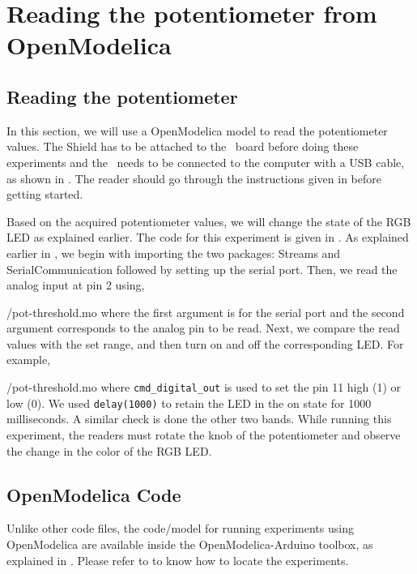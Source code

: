 \section{Reading the potentiometer from OpenModelica}
\subsection{Reading the potentiometer}
In this section, we will use a OpenModelica model to read the potentiometer values.  
The Shield has to be attached to the \arduino\ board
before doing these experiments and the \arduino\ needs to be connected to the computer 
with a USB cable, as shown in .
The reader should go through the instructions given in
 before getting started.

Based on the acquired potentiometer values, we will change the state of the 
RGB LED as explained earlier. The code for this experiment is given in
. As explained earlier in , 
  we begin with importing the two packages: Streams and SerialCommunication followed 
  by setting up the serial port. Then, we read the analog input at pin 2 using,

{\LocPotOpenModelicacode/pot-threshold.mo} where the first argument is for
the serial port and the second argument corresponds to the analog pin to be read.  Next, we compare the read values with the set range, and then turn on and off the corresponding LED. For example, 

{\LocPotOpenModelicacode/pot-threshold.mo} 
where {\tt cmd\_digital\_out} is used to set the pin 11 high (1) or low (0). 
We used {\tt delay(1000)} to retain the LED in the on state for 1000 milliseconds.  
A similar check is done the other two bands. 
While running this experiment, 
the readers must rotate the knob of the potentiometer and observe 
the change in the color of the RGB LED.
\subsection{OpenModelica Code}
Unlike other code files, the code/model for running experiments using OpenModelica are 
available inside the OpenModelica-Arduino toolbox, as explained in .
Please refer to  to know how to locate the experiments. 

\label{sec:pot-OpenModelica-code}
\begin{OpenModelicacode}
\label{OpenModelica:pot-100}

\end{OpenModelicacode}
